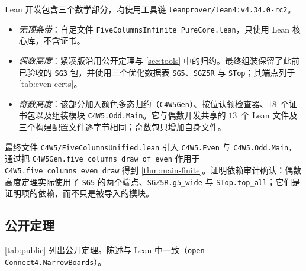 \documentclass[11pt,a4paper]{article}
\theoremstyle{zhthm}
\newcommand{\code}[1]{{\upshape\texttt{\small\nolinkurl{#1}}}}
\begin{document}
Lean 开发包含三个数学部分，均使用工具链 \code{leanprover/lean4:v4.34.0-rc2}。
\begin{itemize}
  \item \emph{无顶条带}：自足文件 \code{FiveColumnsInfinite_PureCore.lean}，只使用 Lean 核心库，不含证书。
  \item \emph{偶数高度}：紧凑版沿用公开定理与 \cref{sec:tools} 中的归约。最终组装保留了此前已验收的 \code{SG3} 包，并使用三个优化数据表 \code{SG5}、\code{SGZ5R} 与 \code{STop}；其端点列于 \cref{tab:even-certs}。
  \item \emph{奇数高度}：该部分加入颜色多态归约（\code{C4W5Gen}）、按位认领检查器、$18$~个证书包以及组装模块 \code{C4W5.Odd.Main}。它与偶数开发共享的 $13$~个 Lean 文件及三个构建配置文件逐字节相同；奇数包只增加自身文件。
\end{itemize}
最终文件 \code{C4W5/FiveColumnsUnified.lean} 引入 \code{C4W5.Even} 与 \code{C4W5.Odd.Main}，通过把 \code{C4W5Gen.five_columns_draw_of_even} 作用于 \code{C4W5.five_columns_even_draw} 得到 \cref{thm:main-finite}。证明依赖审计确认：偶数高度定理实际使用了 \code{SG5} 的两个端点、\code{SGZ5R.g5_wide} 与 \code{STop.top_all}；它们是证明项的依赖，而不只是被导入的模块。

\subsection{公开定理}
\label{sec:public}

\cref{tab:public} 列出公开定理。陈述与 Lean 中一致（\code{open Connect4.NarrowBoards}）。
\end{document}
